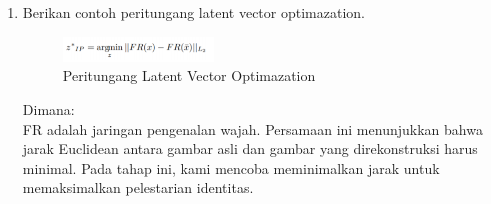 \begin{enumerate}
\item Berikan contoh peritungang latent vector optimazation.

\begin{figure}
	\includegraphics[width=4cm]{figures/1174062/9/nomor11.png}
	\centering
	\caption{Peritungang Latent Vector Optimazation}
\end{figure}


Dimana:\\
FR adalah jaringan pengenalan wajah. Persamaan ini menunjukkan bahwa jarak Euclidean antara gambar asli dan gambar yang direkonstruksi harus minimal. Pada tahap ini, kami mencoba meminimalkan jarak untuk memaksimalkan pelestarian identitas.
\end{enumerate}

